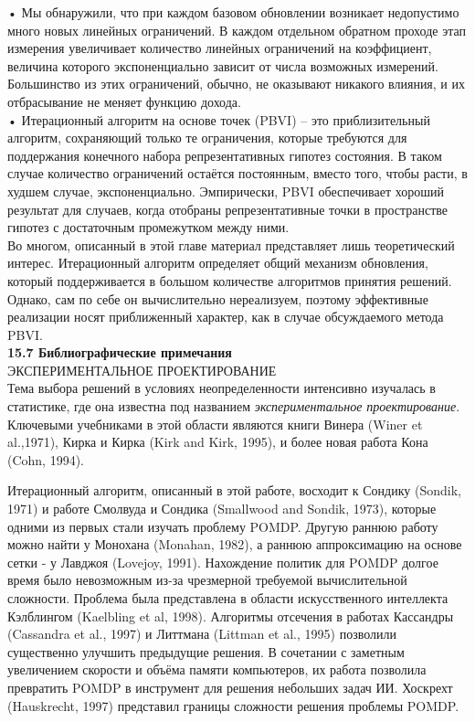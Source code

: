 \documentclass[10pt,a4paper]{article}
\begin{document}
•	Мы обнаружили, что при каждом базовом обновлении возникает недопустимо много новых линейных ограничений. В каждом отдельном обратном проходе этап измерения увеличивает количество линейных ограничений на коэффициент, величина которого экспоненциально зависит от числа возможных измерений. Большинство из этих ограничений, обычно, не оказывают никакого влияния, и их отбрасывание не меняет функцию дохода.\\

•	Итерационный алгоритм на основе точек (PBVI) – это приблизительный алгоритм, сохраняющий только те ограничения, которые требуются для поддержания конечного набора репрезентативных гипотез состояния. В таком случае количество ограничений остаётся постоянным, вместо того, чтобы расти, в худшем случае, экспоненциально. Эмпирически, PBVI обеспечивает хороший результат для случаев, когда отобраны репрезентативные точки в пространстве гипотез с достаточным промежутком между ними.\\

Во многом, описанный в этой главе материал представляет лишь теоретический интерес.  Итерационный алгоритм определяет общий механизм обновления, который поддерживается в большом количестве алгоритмов принятия решений. Однако, сам по себе он вычислительно нереализуем, поэтому эффективные реализации носят приближенный характер, как в случае обсуждаемого метода PBVI.\\

\textbf{15.7	Библиографические примечания}\\

ЭКСПЕРИМЕНТАЛЬНОЕ ПРОЕКТИРОВАНИЕ\\

Тема выбора решений в условиях неопределенности интенсивно изучалась в статистике, где она известна под названием \textit{экспериментальное проектирование}. Ключевыми учебниками в этой области являются книги Винера (Winer et al.,1971), Кирка и Кирка (Kirk and Kirk, 1995), и более новая работа Кона (Cohn, 1994).

Итерационный алгоритм, описанный в этой работе, восходит к Сондику (Sondik, 1971) и работе Смолвуда и Сондика (Smallwood and Sondik, 1973), которые одними из первых стали изучать проблему POMDP. Другую раннюю работу можно найти у Монохана (Monahan, 1982), а раннюю аппроксимацию на основе сетки - у Лавджоя (Lovejoy, 1991). Нахождение политик для POMDP долгое время было невозможным из-за чрезмерной требуемой вычислительной сложности. Проблема была представлена в области искусственного интеллекта Кэлблингом (Kaelbling et al, 1998). Алгоритмы отсечения в работах Кассандры (Cassandra et al., 1997) и Литтмана (Littman et al., 1995) позволили существенно улучшить предыдущие решения. В сочетании с заметным увеличением скорости и объёма памяти компьютеров, их работа позволила превратить POMDP в инструмент для решения небольших задач ИИ. Хоскрехт (Hauskrecht, 1997) представил границы сложности решения проблемы POMDP. 
\end{document}

